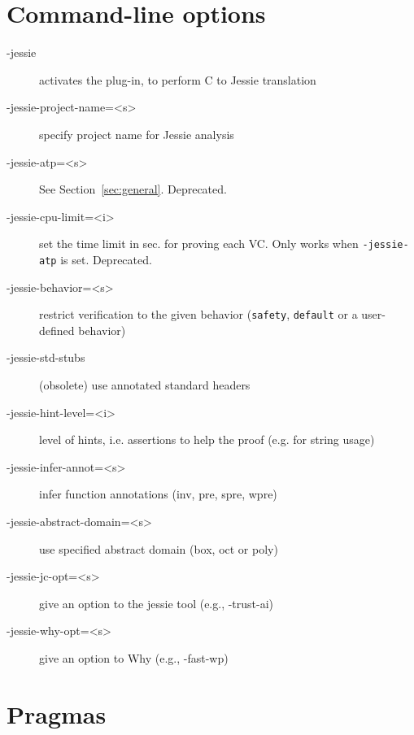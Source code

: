 \documentclass[a4paper,11pt,twoside,openright]{report}
\begin{document}
\section{Command-line options}

\begin{description}
\item[-jessie]
  activates the plug-in, to perform C to Jessie translation

\item[-jessie-project-name=<s>]
  specify project name for Jessie analysis

\item[-jessie-atp=<s>] See Section~\ref{sec:general}. Deprecated.

\item[-jessie-cpu-limit=<i>] set the time limit in sec. for proving
  each VC. Only works when \verb|-jessie-atp| is set. Deprecated.

\item[-jessie-behavior=<s>] restrict verification to the given
  behavior (\texttt{safety}, \texttt{default} or a user-defined
  behavior)

\item[-jessie-std-stubs]
  (obsolete) use annotated standard headers

\item[-jessie-hint-level=<i>]
  level of hints, i.e. assertions to help the
  proof (e.g. for string usage)

\item[-jessie-infer-annot=<s>]
  infer function annotations (inv, pre, spre, wpre)

\item[-jessie-abstract-domain=<s>]
  use specified abstract domain (box, oct or poly)

\item[-jessie-jc-opt=<s>] give an option to
  the jessie tool (e.g., -trust-ai)

\item[-jessie-why-opt=<s>]
  give an option to Why (e.g., -fast-wp)
\end{description}

\section{Pragmas}
\end{document}
